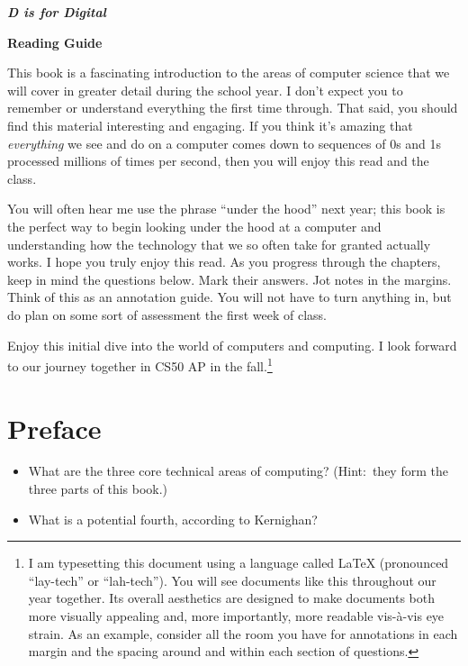 \documentclass[12pt]{article}
\author{Peter Strawn}
\begin{document}
\begin{center}
\LARGE{\textbf{\textit{D is for Digital}}}
\end{center}
\begin{center}
\large{\textbf{Reading Guide}}
\end{center}

This book is a fascinating introduction to the areas of computer science that we will cover in greater detail during the school year. I don't expect you to remember or understand everything the first time through. That said, you should find this material interesting and engaging. If you think it's amazing that \textit{everything} we see and do on a computer comes down to sequences of 0s and 1s processed millions of times per second, then you will enjoy this read and the class.

You will often hear me use the phrase ``under the hood'' next year; this book is the perfect way to begin looking under the hood at a computer and understanding how the technology that we so often take for granted actually works. I hope you truly enjoy this read. As you progress through the chapters, keep in mind the questions below. Mark their answers. Jot notes in the margins. Think of this as an annotation guide. You will not have to turn anything in, but do plan on some sort of assessment the first week of class.

Enjoy this initial dive into the world of computers and computing. I look forward to our journey together in CS50 AP in the fall.\footnote{I am typesetting this document using a language called \LaTeX{} (pronounced ``lay-tech'' or ``lah-tech''). You will see documents like this throughout our year together. Its overall aesthetics are designed to make documents both more visually appealing and, more importantly, more readable vis-\`{a}-vis eye strain. As an example, consider all the room you have for annotations in each margin and the spacing around and within each section of questions.} 

\section*{Preface}
\begin{itemize}
	\item What are the three core technical areas of computing? (Hint:\  they form the three parts of this book.)
	\item What is a potential fourth, according to Kernighan?
\end{itemize}
\end{document}
